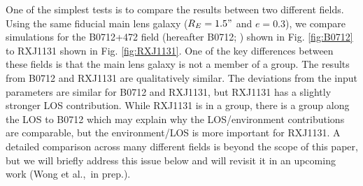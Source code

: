 One of the simplest tests is to compare the results between two different fields. Using the same fiducial main lens galaxy ($R_E = 1.5"$ and $e=0.3$), we compare simulations for the B0712+472 field (hereafter B0712; \citealt{Jackson98}) shown in Fig. \ref{fig:B0712} to RXJ1131 shown in Fig. \ref{fig:RXJ1131}. One of the key differences between these fields is that the main lens galaxy is not a member of a group. The results from B0712 and RXJ1131 are qualitatively similar. The deviations from the input parameters are similar for B0712 and RXJ1131, but RXJ1131 has a slightly stronger LOS contribution. While RXJ1131 is in a group, there is a group along the LOS to B0712 which may explain why the LOS/environment contributions are comparable, but the environment/LOS is more important for RXJ1131. A detailed comparison across many different fields is beyond the scope of this paper, but we will briefly address this issue below and will revisit it in an upcoming work (Wong et al.,~in prep.).
  